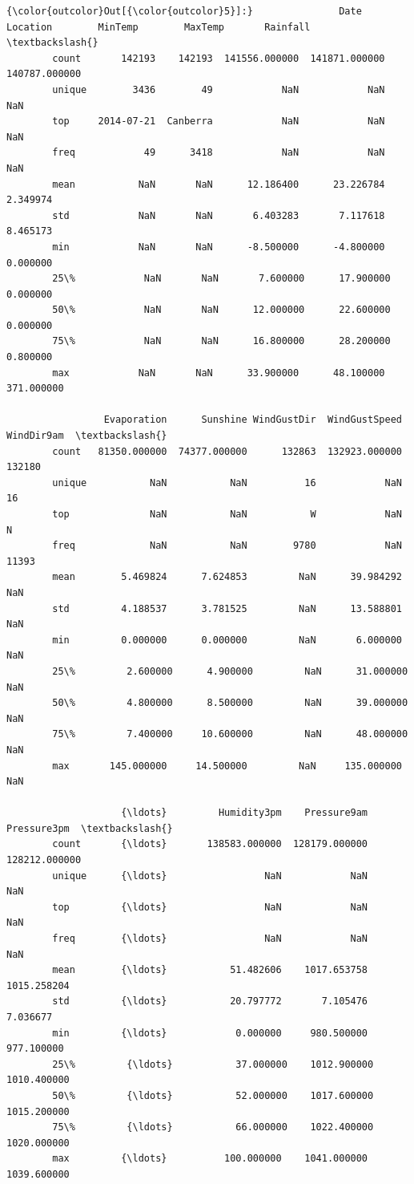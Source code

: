 \documentclass[11pt]{article}
\begin{document}
\begin{Verbatim}[commandchars=\\\{\}]
{\color{outcolor}Out[{\color{outcolor}5}]:}               Date  Location        MinTemp        MaxTemp       Rainfall  \textbackslash{}
        count       142193    142193  141556.000000  141871.000000  140787.000000   
        unique        3436        49            NaN            NaN            NaN   
        top     2014-07-21  Canberra            NaN            NaN            NaN   
        freq            49      3418            NaN            NaN            NaN   
        mean           NaN       NaN      12.186400      23.226784       2.349974   
        std            NaN       NaN       6.403283       7.117618       8.465173   
        min            NaN       NaN      -8.500000      -4.800000       0.000000   
        25\%            NaN       NaN       7.600000      17.900000       0.000000   
        50\%            NaN       NaN      12.000000      22.600000       0.000000   
        75\%            NaN       NaN      16.800000      28.200000       0.800000   
        max            NaN       NaN      33.900000      48.100000     371.000000   
        
                 Evaporation      Sunshine WindGustDir  WindGustSpeed WindDir9am  \textbackslash{}
        count   81350.000000  74377.000000      132863  132923.000000     132180   
        unique           NaN           NaN          16            NaN         16   
        top              NaN           NaN           W            NaN          N   
        freq             NaN           NaN        9780            NaN      11393   
        mean        5.469824      7.624853         NaN      39.984292        NaN   
        std         4.188537      3.781525         NaN      13.588801        NaN   
        min         0.000000      0.000000         NaN       6.000000        NaN   
        25\%         2.600000      4.900000         NaN      31.000000        NaN   
        50\%         4.800000      8.500000         NaN      39.000000        NaN   
        75\%         7.400000     10.600000         NaN      48.000000        NaN   
        max       145.000000     14.500000         NaN     135.000000        NaN   
        
                    {\ldots}         Humidity3pm    Pressure9am    Pressure3pm  \textbackslash{}
        count       {\ldots}       138583.000000  128179.000000  128212.000000   
        unique      {\ldots}                 NaN            NaN            NaN   
        top         {\ldots}                 NaN            NaN            NaN   
        freq        {\ldots}                 NaN            NaN            NaN   
        mean        {\ldots}           51.482606    1017.653758    1015.258204   
        std         {\ldots}           20.797772       7.105476       7.036677   
        min         {\ldots}            0.000000     980.500000     977.100000   
        25\%         {\ldots}           37.000000    1012.900000    1010.400000   
        50\%         {\ldots}           52.000000    1017.600000    1015.200000   
        75\%         {\ldots}           66.000000    1022.400000    1020.000000   
        max         {\ldots}          100.000000    1041.000000    1039.600000   
        

\end{Verbatim}
\end{document}
